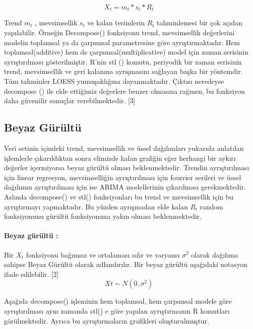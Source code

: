 \documentclass[11pt]{article}
\begin{document}
\[X_t=m_t*s_t*R_t\]

Trend \(m_t\) , mevsimsellik \(s_t\) ve kalan terimlerin \(R_t\)
tahminlemesi bir çok açıdan yapılabilir. Örneğin Decompose() fonksiyonu
trend, mevsimsellik değerlerini modelin toplamsal ya da çarpımsal
parametresine göre ayrıştırmaktadır. Hem toplamsal(additive) hem de
çarpımsal(multiplicative) model için zaman serisinin ayrıştırılması
gösterilmiştir. R'nin stl () komutu, periyodik bir zaman serisinin
trend, mevsimsellik ve geri kalanına ayrışmasını sağlayan başka bir
yöntemdir. Tüm tahminler LOESS yumuşaklığına dayanmaktadır. Çıktısı
neredeyse decompose () ile elde ettiğimiz değerlere benzer olmasına
rağmen, bu fonksiyon daha güvenilir sonuçlar verebilmektedir. {[}3{]}

\subsection{Beyaz Gürültü}\label{beyaz-guxfcruxfcltuxfc}

Veri setinin içindeki trend, mevsimsellik ve üssel dağılımları yukarıda
anlatılan işlemlerle çıkarıldıktan sonra elimizde kalan grafiğin eğer
herhangi bir aykırı değerler içermiyorsa beyaz gürültü olması
beklenmektedir. Trendin ayrıştırılması için linear regresyon,
mevsimselliğin ayrıştırılması için fourrier serileri ve üssel dağılımın
ayrıştırılması için ise ARIMA modellerinin çıkarılması gerekmektedir.
Aslında decompose() ve stl() fonksiyonları bu trend ve mevsimsellik için
bu ayrıştırmayı yapmaktadır. Bu yüzden ayrışmadan elde kalan \(R_t\)
random fonksiyonunu gürültü fonksiyonuna yakın olması beklenmektedir.

\paragraph{Beyaz gürültü :}\label{beyaz-guxfcruxfcltuxfc-1}
 Bir \({X_t}\) fonksiyonu bağımsız ve ortalaması sıfır ve varyansı
\(σ^2\) olarak dağılıma sahipse Beyaz Gürültü olarak adlandırılır. Bir
beyaz gürültü aşağıdaki notasyon ifade edilebilir. {[}2{]}
\[{Xt} ∼ N(0, σ^2)\]

Aşağıda decompose() işleminin hem toplamsal, hem çarpımsal modele göre
ayrıştırılması aynı zamanda stl() e göre yapılan ayrıştırmanın R
komutları görülmektedir. Ayrıca bu ayrıştırmaların grafikleri
oluşturulmuştur.
\end{document}
